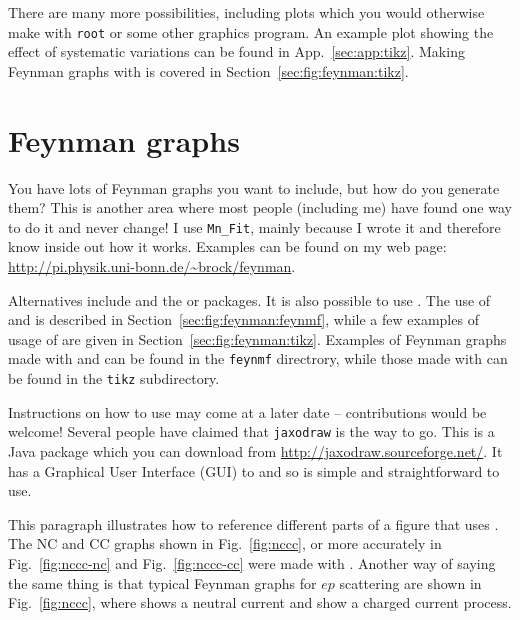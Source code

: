 There are many more possibilities,
including plots which you would otherwise make with \texttt{root} or
some other graphics program. An example plot showing the effect of
systematic variations can be found in App.~\ref{sec:app:tikz}. Making
Feynman graphs with \TikZ is covered in
Section~\ref{sec:fig:feynman:tikz}.

\section{Feynman graphs}
\label{sec:fig:feynman}

You have lots of Feynman graphs you want to include, but how do you
generate them? This is another area where most people (including me)
have found one way to do it and never change! I use \texttt{Mn\_Fit},
mainly because I wrote it and therefore know inside out how it
works. Examples can be found on my web page:
\url{http://pi.physik.uni-bonn.de/~brock/feynman}.

Alternatives include  and the  or
 packages.  It is also possible to use
. The use of  and  is
described in Section~\ref{sec:fig:feynman:feynmf}, while a few
examples of usage of  are given in
Section~\ref{sec:fig:feynman:tikz}. Examples of Feynman graphs made
with  and  can be found in the
\texttt{feynmf} directrory, while those made with  can
be found in the \texttt{tikz} subdirectory.

Instructions on how to use  may come at a later
date -- contributions would be welcome! Several people have claimed
that \texttt{jaxodraw} is the way to go. This is a Java package which
you can download from \url{http://jaxodraw.sourceforge.net/}. It has
a Graphical User Interface (GUI) to  and so is simple and
straightforward to use.

This paragraph illustrates how to reference different parts of a
figure that uses . The NC and CC graphs shown in
Fig.~\ref{fig:nccc}, or more accurately in Fig.~\ref{fig:nccc-nc} and
Fig.~\ref{fig:nccc-cc} were made with . Another way of
saying the same thing is that typical Feynman graphs for $ep$
scattering are shown in Fig.~\ref{fig:nccc}, where
 shows a neutral current and 
show a charged current process.


